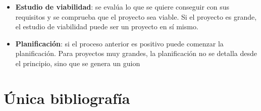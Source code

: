 \documentclass[12pt]{article}
\begin{document}
\begin{itemize}
    \item {\textbf{Estudio de viabilidad}: se evalúa lo que se quiere conseguir con sus requisitos y se comprueba que el proyecto sea viable. Si el proyecto es grande, el estudio de viabilidad puede ser un proyecto en sí mismo.}
    \item {\textbf{Planificación}: si el proceso anterior es positivo puede comenzar la planificación. Para proyectos muy grandes, la planificación no se detalla desde el principio, sino que se genera un guion }
\end{itemize}


\newpage
\section{Única bibliografía}
\nocite{*}
\begingroup
\renewcommand{\section}[2]{}%
\printbibliography
\endgroup
\end{document}

